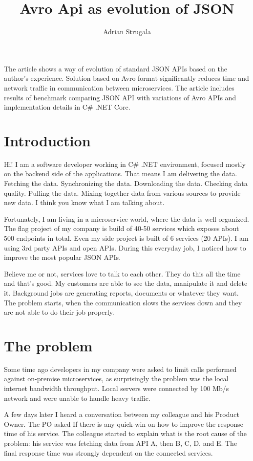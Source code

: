 \documentclass[]{article}
\title{Avro Api as evolution of JSON}
\author{Adrian Strugala}
\begin{document}
\maketitle

The article shows a way of evolution of standard JSON APIs based on the author's experience. Solution based on Avro format significantly reduces time and network traffic in communication between microservices. The article includes results of benchmark comparing JSON API with variations of Avro APIs and implementation details in C\# .NET Core.

\section{Introduction}

Hi! I am a software developer working in C\# .NET environment, focused mostly on the backend side of the applications. That means I am delivering the data. Fetching the data. Synchronizing the data. Downloading the data. Checking data quality. Pulling the data. Mixing together data from various sources to provide new data. I think you know what I am talking about.

Fortunately, I am living in a microservice world, where the data is well organized. The flag project of my company is build of 40-50 services which exposes about 500 endpoints in total. Even my side project is built of 6 services (20 APIs). I am using 3rd party APIs and open APIs. During this everyday job, I noticed how to improve the most popular JSON APIs.

Believe me or not, services love to talk to each other. They do this all the time and that's good. My customers are able to see the data, manipulate it and delete it. Background jobs are generating reports, documents or whatever they want. The problem starts, when the communication slows the services down and they are not able to do their job properly.


\section{The problem}

Some time ago developers in my company were asked to limit calls performed against on-premise microservices, as surprisingly the problem was the local internet bandwidth throughput. Local servers were connected by 100 Mb/s network and were unable to handle heavy traffic.

A few days later I heard a conversation between my colleague and his Product Owner. The PO asked If there is any quick-win on how to improve the response time of his service. The colleague started to explain what is the root cause of the problem: his service was fetching data from API A, then B, C, D, and E. The final response time was strongly dependent on the connected services. 
\end{document}
